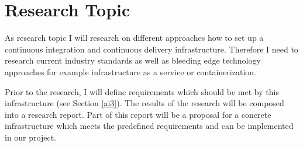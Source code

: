 \section{Research Topic}
\label{sec:research}

As research topic I will research on different approaches how to set up a continuous integration and continuous delivery infrastructure.
Therefore I need to research current industry standards as well as bleeding edge technology approaches for example infrastructure as a service or containerization.

Prior to the research, I will define requirements which should be met by this infrastructure (see Section \ref{ai3}).
The results of the research will be composed into a research report. Part of this report will be a proposal for a concrete infrastructure which meets the predefined requirements and can be implemented in our project.
